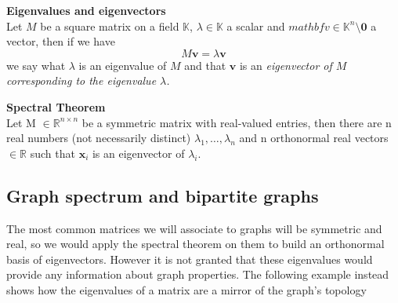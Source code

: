 \begin{definition}{\textbf{Eigenvalues and eigenvectors}} \\
Let $ M $ be a square matrix on a field $ \mathbb{K} $, $ \lambda \in \mathbb{K} $ a scalar and $ mathbf{v} \in \mathbb{K}^n \setminus {\mathbf{0}}$ a vector, then if we have
\[M\mathbf{v}=\lambda\mathbf{v}\]
we say what $ \lambda $ is an eigenvalue of $ M $ and that $ \mathbf{v} $ is an \em{eigenvector} of $ M $ corresponding to the \em{eigenvalue} $ \lambda $.
\end{definition}

\begin{theorem}{\textbf{Spectral Theorem}} \\
Let M $\in \mathbb{R}^{n \times n}$ be a symmetric matrix with real-valued entries, then there are n real numbers (not necessarily distinct) $\lambda_1, \dots, \lambda_n$ and n orthonormal real vectors $\in \mathbb{R}$ such that $\mathbf{x}_i$ is an eigenvector of $\lambda_i$.
\end{theorem}

\subsection{Graph spectrum and bipartite graphs}
The most common matrices we will associate to graphs will be symmetric and real, so we would apply the spectral theorem on them to build an orthonormal basis of eigenvectors. However it is not granted that these eigenvalues would provide any information about graph properties. The following example instead shows how the eigenvalues of a matrix are a mirror of the graph's topology

